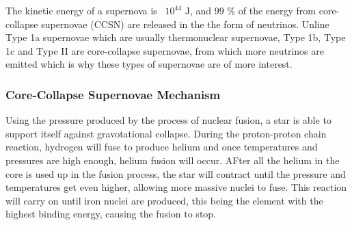 The kinetic energy of a supernova is ~$10^{44}$ J, and 99 \% of the energy from core-collapse supernovae (CCSN) are released in the the form of neutrinos. Unline Type 1a supernovae which are usually thermonuclear supernovae, Type 1b, Type 1c and Type II are core-collapse supernovae, from which more neutrinos are emitted which is why these types of supernovae are of more interest. 

\subsubsection{Core-Collapse Supernovae Mechanism}

Using the pressure produced by the process of nuclear fusion, a star is able to support itself against gravotational collapse. During the proton-proton chain reaction, hydrogen will fuse to produce helium and once temperatures and pressures are high enough, helium fusion will occur. AFter all the helium in the core is used up in the fusion process, the star will contract until the pressure and temperatures get even higher, allowing more massive nuclei to fuse. This reaction will carry on until iron nuclei are produced, this being the element with the highest binding energy, causing the fusion to stop.
\newline
